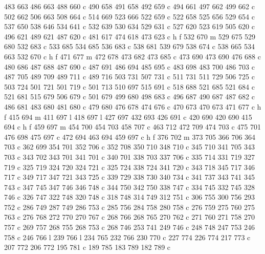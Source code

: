 {{        483 663 486 663 488 660 c
        490 658 491 658 492 659 c
        494 661 497 662 499 662 c
        502 662 506 663 508 664 c
        514 669 523 666 522 659 c
        522 658 525 656 529 654 c
        537 650 538 646 534 641 c
        532 639 530 634 529 631 c
        527 620 523 619 505 620 c
        496 621 489 621 487 620 c
        481 617 474 618 473 623 c
        h f
        532 670 m
        529 675 529 680 532 683 c
        533 685 534 685 536 683 c
        538 681 539 679 538 674 c
        538 665 534 663 532 670 c
        h f
        471 677 m
        472 678 473 682 473 685 c
        473 690 473 690 476 688 c
        480 686 487 688 487 690 c
        487 691 486 694 485 695 c
        483 698 483 700 486 703 c
        487 705 489 709 489 711 c
        489 716 503 731 507 731 c
        511 731 511 729 506 725 c
        503 724 501 721 501 719 c
        501 713 510 697 515 691 c
        518 688 521 685 521 684 c
        521 681 515 679 506 679 c
        501 679 499 680 498 683 c
        496 687 490 687 487 682 c
        486 681 483 680 481 680 c
        479 680 476 678 474 676 c
        470 673 470 673 471 677 c
        h f
        415 694 m
        411 697 l
        418 697 l
        427 697 432 693 426 691 c
        420 690 420 690 415 694 c
        h f
        459 697 m
        454 700 454 703 458 707 c
        463 712 472 709 474 703 c
        475 701 476 698 475 697 c
        472 694 463 694 459 697 c
        h f
        376 702 m
        373 705 366 706 364 703 c
        362 699 354 701 352 706 c
        352 708 350 710 348 710 c
        345 710 341 705 343 703 c
        343 702 343 701 341 701 c
        340 701 338 703 337 706 c
        335 714 331 719 327 719 c
        325 719 324 720 324 721 c
        325 724 338 724 341 720 c
        343 718 345 717 346 717 c
        349 717 347 721 343 725 c
        339 729 338 730 340 734 c
        341 737 343 741 345 743 c
        347 745 347 746 346 748 c
        344 750 342 750 338 747 c
        334 745 332 745 328 746 c
        326 747 322 748 320 748 c
        318 748 314 749 312 751 c
        306 755 300 756 293 752 c
        286 749 287 749 286 753 c
        285 756 284 758 280 758 c
        276 759 275 760 275 763 c
        276 768 272 770 270 767 c
        268 766 268 765 270 762 c
        271 760 271 758 270 757 c
        269 757 268 755 268 753 c
        268 746 253 741 249 746 c
        248 748 247 753 246 758 c
        246 766 l
        239 766 l
        234 765 232 766 230 770 c
        227 774 226 774 217 773 c
        207 772 206 772 195 781 c
        189 785 183 789 182 789 c
}}
